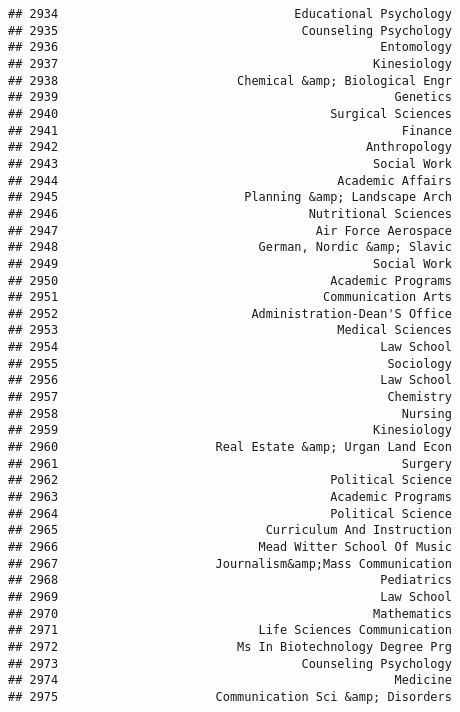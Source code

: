 \documentclass[
]{article}
\begin{document}
\begin{verbatim}
## 2934                                 Educational Psychology
## 2935                                  Counseling Psychology
## 2936                                             Entomology
## 2937                                            Kinesiology
## 2938                         Chemical &amp; Biological Engr
## 2939                                               Genetics
## 2940                                      Surgical Sciences
## 2941                                                Finance
## 2942                                           Anthropology
## 2943                                            Social Work
## 2944                                       Academic Affairs
## 2945                          Planning &amp; Landscape Arch
## 2946                                   Nutritional Sciences
## 2947                                    Air Force Aerospace
## 2948                            German, Nordic &amp; Slavic
## 2949                                            Social Work
## 2950                                      Academic Programs
## 2951                                     Communication Arts
## 2952                           Administration-Dean'S Office
## 2953                                       Medical Sciences
## 2954                                             Law School
## 2955                                              Sociology
## 2956                                             Law School
## 2957                                              Chemistry
## 2958                                                Nursing
## 2959                                            Kinesiology
## 2960                      Real Estate &amp; Urgan Land Econ
## 2961                                                Surgery
## 2962                                      Political Science
## 2963                                      Academic Programs
## 2964                                      Political Science
## 2965                             Curriculum And Instruction
## 2966                            Mead Witter School Of Music
## 2967                      Journalism&amp;Mass Communication
## 2968                                             Pediatrics
## 2969                                             Law School
## 2970                                            Mathematics
## 2971                            Life Sciences Communication
## 2972                         Ms In Biotechnology Degree Prg
## 2973                                  Counseling Psychology
## 2974                                               Medicine
## 2975                      Communication Sci &amp; Disorders

\end{verbatim}
\end{document}
